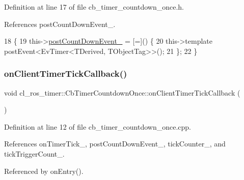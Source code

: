 Definition at line 17 of file cb\+\_\+timer\+\_\+countdown\+\_\+once.\+h.



References post\+Count\+Down\+Event\+\_\+.


\begin{DoxyCode}
18     \{
19         this->\hyperlink{classcl__ros__timer_1_1CbTimerCountdownOnce_a5ab3b0a0aa38f28bc3091583d30fe003}{postCountDownEvent\_} = [=]() \{
20             this->\textcolor{keyword}{template} postEvent<EvTimer<TDerived, TObjectTag>>();
21         \};
22     \}
\end{DoxyCode}
\mbox{\label{classcl__ros__timer_1_1CbTimerCountdownOnce_a2b02bbde9c9321781b70b9371b22673a}} 
\subsubsection{\texorpdfstring{on\+Client\+Timer\+Tick\+Callback()}{onClientTimerTickCallback()}}
{\footnotesize\ttfamily void cl\+\_\+ros\+\_\+timer\+::\+Cb\+Timer\+Countdown\+Once\+::on\+Client\+Timer\+Tick\+Callback (\begin{DoxyParamCaption}{ }\end{DoxyParamCaption})\hspace{0.3cm}{\ttfamily [private]}}



Definition at line 12 of file cb\+\_\+timer\+\_\+countdown\+\_\+once.\+cpp.



References on\+Timer\+Tick\+\_\+, post\+Count\+Down\+Event\+\_\+, tick\+Counter\+\_\+, and tick\+Trigger\+Count\+\_\+.



Referenced by on\+Entry().


